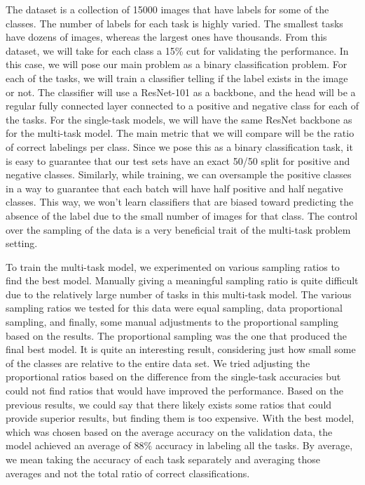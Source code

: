 The dataset is a collection of 15000 images that have labels for some of the classes.
The number of labels for each task is highly varied.
The smallest tasks have dozens of images, whereas the largest ones have thousands.
From this dataset, we will take for each class a 15\% cut for validating the performance.
In this case, we will pose our main problem as a binary classification problem.
For each of the tasks, we will train a classifier telling if the label exists in the image or not.
The classifier will use a ResNet-101 as a backbone, and the head will be a regular fully connected layer connected to a positive and negative class for each of the tasks.
For the single-task models, we will have the same ResNet backbone as for the multi-task model.
The main metric that we will compare will be the ratio of correct labelings per class.
Since we pose this as a binary classification task, it is easy to guarantee that our test sets have an exact 50/50 split for positive and negative classes.
Similarly, while training, we can oversample the positive classes in a way to guarantee that each batch will have half positive and half negative classes.
This way, we won't learn classifiers that are biased toward predicting the absence of the label due to the small number of images for that class.
The control over the sampling of the data is a very beneficial trait of the multi-task problem setting.

To train the multi-task model, we experimented on various sampling ratios to find the best model.
Manually giving a meaningful sampling ratio is quite difficult due to the relatively large number of tasks in this multi-task model.
The various sampling ratios we tested for this data were equal sampling, data proportional sampling, and finally, some manual adjustments to the proportional sampling based on the results.
The proportional sampling was the one that produced the final best model.
It is quite an interesting result, considering just how small some of the classes are relative to the entire data set.
We tried adjusting the proportional ratios based on the difference from the single-task accuracies but could not find ratios that would have improved the performance.
Based on the previous results, we could say that there likely exists some ratios that could provide superior results, but finding them is too expensive.
With the best model, which was chosen based on the average accuracy on the validation data, the model achieved an average of 88\% accuracy in labeling all the tasks.
By average, we mean taking the accuracy of each task separately and averaging those averages and not the total ratio of correct classifications.

